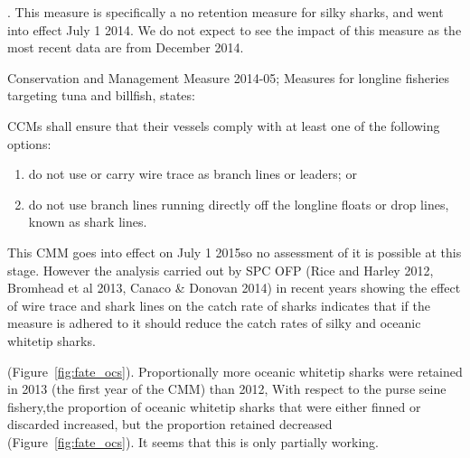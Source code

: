 \documentclass[12pt]{SCreport}
\begin{document}
\begin{description}
 
\item[CMM 2013-08 : Conservation and Management Measure for Silky Shark]. This measure is specifically a no retention measure for silky sharks, and went into effect July 1 2014. We do not expect to see the impact of this measure as the most recent data are from December 2014. 

\item  Conservation and Management Measure 2014-05; Measures for longline fisheries targeting tuna and billfish,  states: 

      CCMs shall ensure that their vessels comply with at least one of the following options:
        \begin{enumerate}
            \item  do not use or carry wire trace as branch lines or leaders; or
              \item  do not use branch lines running directly off the longline floats or drop lines, known as shark lines. 
           \end{enumerate}
This CMM goes into effect on July 1 2015so no assessment of it is possible at this stage. However the analysis carried out by SPC OFP (Rice and Harley 2012, Bromhead et al 2013, Canaco \& Donovan 2014) in recent years showing the effect of wire trace and shark lines on the catch rate of sharks indicates that if the measure is adhered to it should reduce the catch rates of silky and oceanic whitetip sharks.

 \end{description}
(Figure~\ref{fig:fate_ocs}).  
Proportionally  more oceanic whitetip sharks were retained in 2013 (the first year of the CMM) than 2012,   With respect to the purse seine fishery,the proportion of oceanic whitetip sharks that were either finned or discarded increased, but the proportion retained decreased (Figure~\ref{fig:fate_ocs}).  It seems that this is only partially working.
\end{document}
